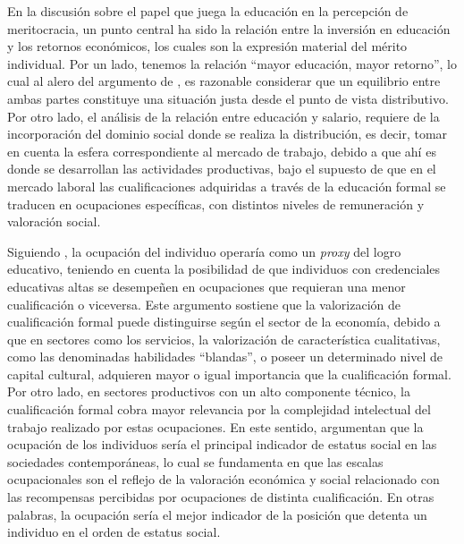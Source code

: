 \documentclass[12pt]{article}
\begin{document}
En la discusión sobre el papel que juega la educación en la percepción de meritocracia, un punto central ha sido la relación entre la inversión en educación y los retornos económicos, los cuales son la expresión material del mérito individual. Por un lado, tenemos la relación ``mayor educación, mayor retorno'', lo cual al alero del argumento de \citet{Adams1965}, es razonable considerar que un equilibrio entre ambas partes constituye una situación justa desde el punto de vista distributivo. Por otro lado, el análisis de la relación entre educación y salario, requiere de la incorporación del dominio social donde se realiza la distribución, es decir, tomar en cuenta la esfera correspondiente al mercado de trabajo, debido a que ahí es donde se desarrollan las actividades productivas, bajo el supuesto de que en el mercado laboral las cualificaciones adquiridas a través de la educación formal se traducen en ocupaciones específicas, con distintos niveles de remuneración y valoración social.    

Siguiendo \citet{Goldthorpe2003}, la ocupación del individuo operaría como un \textit{proxy} del logro educativo, teniendo en cuenta la posibilidad de que individuos con credenciales educativas altas se desempeñen en ocupaciones que requieran una menor cualificación o viceversa. Este argumento sostiene que la valorización de cualificación formal puede distinguirse según el sector de la economía, debido a que en sectores como los servicios, la valorización de característica cualitativas, como las denominadas habilidades ``blandas'', o poseer un determinado nivel de capital cultural, adquieren mayor o igual importancia que la cualificación formal. Por otro lado, en sectores productivos con un alto componente técnico, la cualificación formal cobra mayor relevancia por la complejidad intelectual del trabajo realizado por estas ocupaciones. En este sentido, \citet{Chan2004, Chan2007} argumentan que la ocupación de los individuos sería el principal indicador de estatus social en las sociedades contemporáneas, lo cual se fundamenta en que las escalas ocupacionales son el reflejo de la valoración económica y social relacionado con las recompensas percibidas por ocupaciones de distinta cualificación. En otras palabras, la ocupación sería el mejor indicador de la posición que detenta un individuo en el orden de estatus social.
\end{document}
